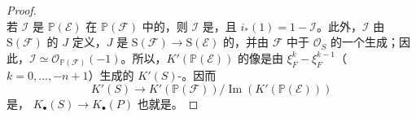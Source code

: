 \begin{proof}
\[\]
若 $\mathcal I$ 是 $\mathbb P(\mathcal E)$ 在 $\mathbb P(\mathcal F)$ 中的，则 $\mathcal I$ 是，且 $i_*(1)=1-\mathcal I$。此外，$\mathcal I$ 由 $\mathrm S(\mathcal F)$ 的 $J$ 定义，$J$ 是 $\mathrm S(\mathcal F)\to\mathrm S(\mathcal E)$ 的，并由 $\mathcal F$ 中于 $\mathcal O_S$ 的一个生成；因此，$\mathcal I\simeq\mathcal O_{\mathbb P(\mathcal F)}(-1)$。所以，$K'(\mathbb P(\mathcal E))$ 的像是由 $\xi_F^k-\xi_F^{k-1}$（$k=0,\ldots,-n+1$）生成的 $K'(S)$-。因而
\[
K'(S)\longrightarrow K'(\mathbb P(\mathcal F))/\operatorname{Im}(K'(\mathbb P(\mathcal E)))
\]
是， $K_\bullet(S)\to K_\bullet(P)$ 也就是。
\end{proof}

